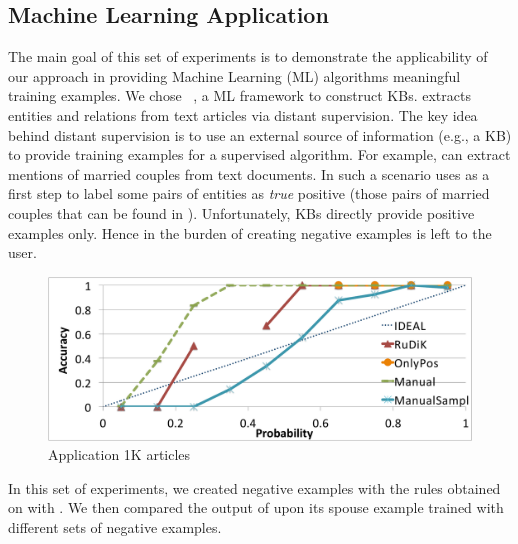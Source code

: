 \subsection{Machine Learning Application} \label{sec:krd_deep_dive}
The main goal of this set of experiments is to demonstrate the applicability of our approach in providing Machine Learning (ML) algorithms meaningful training examples.
We chose \deepdive~\cite{shin2015incremental}, a ML framework to construct KBs. \deepdive extracts entities and relations from text articles via distant supervision. The key idea behind distant supervision is to use an external source of information (e.g., a KB) to provide training examples for a supervised algorithm. For example, \deepdive can extract mentions of married couples from text documents. In such a scenario \deepdive uses as a first step \dbpedia to label some pairs of entities as \emph{true} positive (those pairs of married couples that can be found in \dbpedia). 
Unfortunately, KBs directly provide positive examples only. Hence in \deepdive the burden of creating negative examples is left to the user. %

\begin{figure}[b]
	\centering
	\vspace{1ex}
	\includegraphics[width=.95\columnwidth]{include/figure/deepDive1K.pdf}
	\vspace{-2ex}
	\caption{\deepdive Application 1K articles}
	\label{fig:deep_dive_1k}
\end{figure}

In this set of experiments, we created negative examples with the rules obtained on \dbpedia with \krd. We then compared the output of \deepdive upon its spouse example trained with different sets of negative examples.

